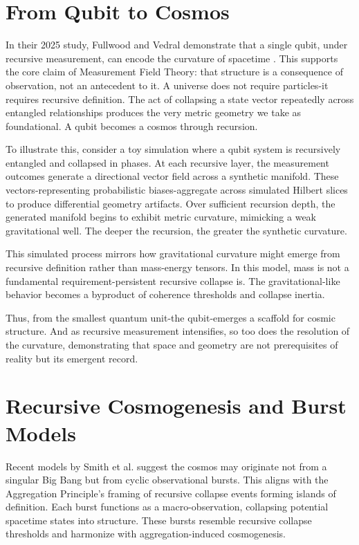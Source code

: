 \section{From Qubit to Cosmos}

In their 2025 study, Fullwood and Vedral demonstrate that a single qubit, under recursive measurement, can encode the curvature of spacetime \cite{aggregation_decoherence_core}. This supports the core claim of Measurement Field Theory: that structure is a consequence of observation, not an antecedent to it. A universe does not require particles-it requires recursive definition. The act of collapsing a state vector repeatedly across entangled relationships produces the very metric geometry we take as foundational. A qubit becomes a cosmos through recursion.

To illustrate this, consider a toy simulation where a qubit system is recursively entangled and collapsed in phases. At each recursive layer, the measurement outcomes generate a directional vector field across a synthetic manifold. These vectors-representing probabilistic biases-aggregate across simulated Hilbert slices to produce differential geometry artifacts. Over sufficient recursion depth, the generated manifold begins to exhibit metric curvature, mimicking a weak gravitational well. The deeper the recursion, the greater the synthetic curvature.

This simulated process mirrors how gravitational curvature might emerge from recursive definition rather than mass-energy tensors. In this model, mass is not a fundamental requirement-persistent recursive collapse is. The gravitational-like behavior becomes a byproduct of coherence thresholds and collapse inertia.

Thus, from the smallest quantum unit-the qubit-emerges a scaffold for cosmic structure. And as recursive measurement intensifies, so too does the resolution of the curvature, demonstrating that space and geometry are not prerequisites of reality but its emergent record.

\section{Recursive Cosmogenesis and Burst Models}

Recent models by Smith et al. \cite{aggregation_decoherence_core} suggest the cosmos may originate not from a singular Big Bang but from cyclic observational bursts. This aligns with the Aggregation Principle’s framing of recursive collapse events forming islands of definition. Each burst functions as a macro-observation, collapsing potential spacetime states into structure. These bursts resemble recursive collapse thresholds and harmonize with aggregation-induced cosmogenesis.

